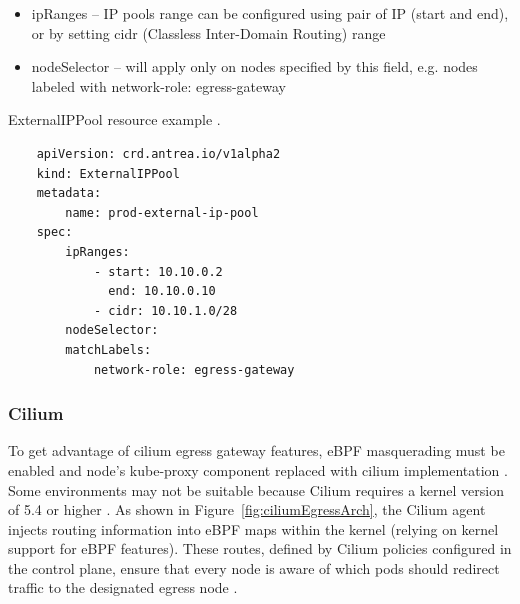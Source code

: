 \begin{itemize}
    \item ipRanges -- IP pools range can be configured using pair of IP (start and end), or by setting cidr (Classless Inter-Domain Routing) range
    \item nodeSelector -- will apply only on nodes specified by this field, e.g. nodes labeled with network-role: egress-gateway
\end{itemize}

\begin{listing}[htb]
    \centering
    \caption{ExternalIPPool resource example \cite{AntreaEgressArch}.}
    \begin{verbatim}
    apiVersion: crd.antrea.io/v1alpha2
    kind: ExternalIPPool
    metadata:
        name: prod-external-ip-pool
    spec:
        ipRanges:
            - start: 10.10.0.2
              end: 10.10.0.10
            - cidr: 10.10.1.0/28
        nodeSelector:
        matchLabels:
            network-role: egress-gateway
    \end{verbatim}
    \label{lst:yamlAntreaExternalIPPool}
\end{listing}
  


\subsubsection{Cilium}
\label{subsection:ciliumEgress}

To get advantage of cilium egress gateway features, eBPF masquerading must be enabled and node's kube-proxy component replaced with cilium implementation \cite{CiliumEgressGateway}. Some environments may not be suitable because Cilium requires a kernel version of 5.4 or higher \cite{CiliumInstall}. As shown in Figure~\ref{fig:ciliumEgressArch}, the Cilium agent injects routing information into eBPF maps within the kernel (relying on kernel support for eBPF features). These routes, defined by Cilium policies configured in the control plane, ensure that every node is aware of which pods should redirect traffic to the designated egress node \cite{CiliumEgressGateway}.

